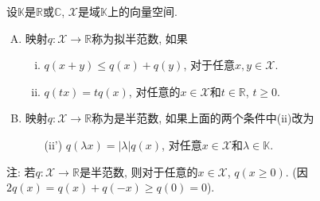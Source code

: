 设$\mathbb{K}$是$\mathbb{R}$或$\mathbb{C}$, $\mathcal{X}$是域$\mathbb{K}$上的向量空间.
\begin{enumerate}[A.]
 \item 映射$q: \mathcal{X}\to\mathbb{R}$称为拟半范数, 如果
 \begin{enumerate}[(i)]
  \item $q(x+y)\le q(x)+q(y)$, 对于任意$x,y\in\mathcal{X}$.
  \item $q(tx)=tq(x)$, 对任意的$x\in\mathcal{X}$和$t\in\mathbb{R}$, $t\ge0$.
 \end{enumerate}
  \item 映射$q:\mathcal{X}\to\mathbb{R}$称为是半范数, 如果上面的两个条件中(ii)改为
  \begin{itemize}
   \item[(ii')] $q(\lambda x)=|\lambda|q(x)$, 对任意$x\in\mathcal{X}$和$\lambda\in\mathbb{K}$.
  \end{itemize}
\end{enumerate}
注: 若$q:\mathcal{X}\to\mathbb{R}$是半范数, 则对于任意的$x\in\mathcal{X}$, $q(x\ge0)$. 
(因$2q(x)=q(x)+q(-x)\ge q(0)=0$).
\ed